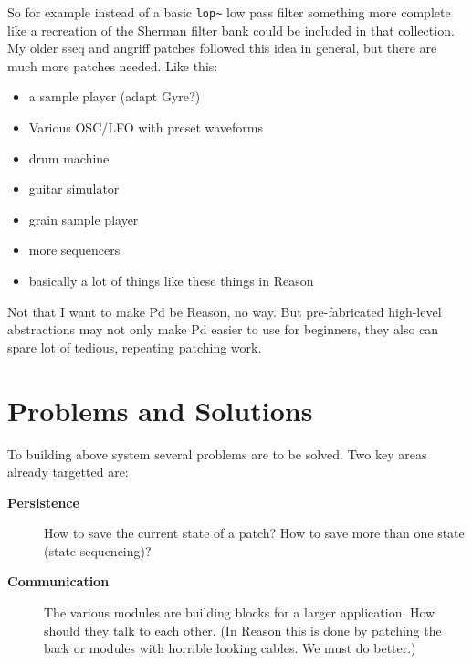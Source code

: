 \documentclass[10pt,english]{scrartcl}
\begin{document}
So for example instead of a basic \texttt{lop{\~{ }}} low pass filter something more
complete like a recreation of the Sherman filter bank could be included in
that collection. My older sseq and angriff patches followed this idea in
general, but there are much more patches needed. Like this:
\begin{itemize}
\item 
a sample player (adapt Gyre?)

\item 
Various OSC/LFO with preset waveforms

\item 
drum machine

\item 
guitar simulator

\item 
grain sample player

\item 
more sequencers

\item 
basically a lot of things like these things in Reason

\end{itemize}

Not that I want to make Pd be Reason, no way. But pre-fabricated high-level
abstractions may not only make Pd easier to use for beginners, they also
can spare lot of tedious, repeating patching work.



\hypertarget{problems-and-solutions}{}
\section*{Problems and Solutions}

To building above system several problems are to be solved. Two key areas
already targetted are:
\begin{description}
\item[\textbf{Persistence}]

How to save the current state of a patch? How to save more than one
state (state sequencing)?

\item[\textbf{Communication}]

The various modules are building blocks for a larger application. How
should they talk to each other. (In Reason this is done by patching the
back or modules with horrible looking cables. We must do better.)

\end{description}
\end{document}
